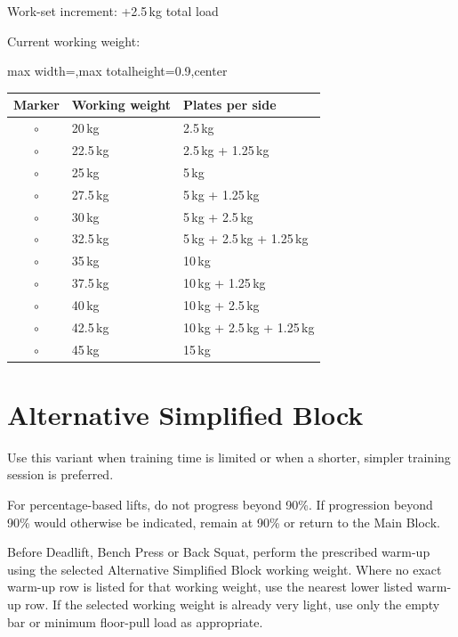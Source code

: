 \documentclass[11pt,a4paper]{article}
\newcommand{\tablearraystretch}{1.15}
\begin{document}
Work-set increment: +2.5\,kg total load

Current working weight:

\begin{center}
\renewcommand{\arraystretch}{\tablearraystretch}
\begin{adjustbox}{max width=\linewidth,max totalheight=0.9\textheight,center}
\begin{tabular}{cll}
\toprule
Marker & Working weight & Plates per side \\
\midrule
$\circ$ & 20\,kg & 2.5\,kg \\
$\circ$ & 22.5\,kg & 2.5\,kg + 1.25\,kg \\
$\circ$ & 25\,kg & 5\,kg \\
$\circ$ & 27.5\,kg & 5\,kg + 1.25\,kg \\
$\circ$ & 30\,kg & 5\,kg + 2.5\,kg \\
$\circ$ & 32.5\,kg & 5\,kg + 2.5\,kg + 1.25\,kg \\
$\circ$ & 35\,kg & 10\,kg \\
$\circ$ & 37.5\,kg & 10\,kg + 1.25\,kg \\
$\circ$ & 40\,kg & 10\,kg + 2.5\,kg \\
$\circ$ & 42.5\,kg & 10\,kg + 2.5\,kg + 1.25\,kg \\
$\circ$ & 45\,kg & 15\,kg \\
\bottomrule
\end{tabular}
\end{adjustbox}
\renewcommand{\arraystretch}{1}
\end{center}

\newpage
\section{Alternative Simplified Block}

Use this variant when training time is limited or when a shorter, simpler training session is preferred.

For percentage-based lifts, do not progress beyond 90\%. If progression beyond 90\% would otherwise be indicated, remain at 90\% or return to the Main Block.

Before Deadlift, Bench Press or Back Squat, perform the prescribed warm-up using the selected Alternative Simplified Block working weight. Where no exact warm-up row is listed for that working weight, use the nearest lower listed warm-up row. If the selected working weight is already very light, use only the empty bar or minimum floor-pull load as appropriate.
\end{document}
